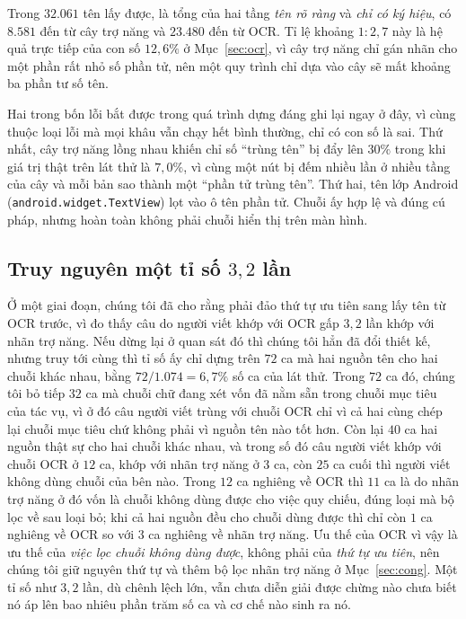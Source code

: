 \documentclass[12pt,a4paper,onecolumn]{article}
\newcommand{\ôvuông}[2]{\tikz[baseline=-0.45ex]{\draw[#1,line width=0.9pt,#2] (0,0) rectangle (0.34,0.18);}}
\newcommand{\code}[1]{{\small\texttt{#1}}}
\begin{document}
Trong $32.061$ tên lấy được, là tổng của hai tầng \emph{tên rõ ràng} và \emph{chỉ có ký
hiệu}, có $8.581$ đến từ cây trợ năng và $23.480$ đến từ OCR. Tỉ lệ khoảng $1{:}2{,}7$ này
là hệ quả trực tiếp của con số $12{,}6\%$ ở Mục~\ref{sec:ocr}, vì cây trợ năng chỉ gán
nhãn cho một phần rất nhỏ số phần tử, nên một quy trình chỉ dựa vào cây sẽ mất khoảng ba
phần tư số tên.

Hai trong bốn lỗi bắt được trong quá trình dựng đáng ghi lại ngay ở đây, vì cùng thuộc loại
lỗi mà mọi khâu vẫn chạy hết bình thường, chỉ có con số là sai. Thứ nhất, cây trợ năng lồng nhau khiến chỉ số ``trùng
tên'' bị đẩy lên $30\%$ trong khi giá trị thật trên lát thử là $7{,}0\%$, vì cùng một nút bị đếm nhiều lần ở nhiều
tầng của cây và mỗi bản sao thành một ``phần tử trùng tên''. Thứ hai, tên lớp Android
(\code{android.widget.TextView}) lọt vào ô tên phần tử. Chuỗi ấy hợp lệ và đúng cú pháp,
nhưng hoàn toàn không phải chuỗi hiển thị trên màn hình.

\subsection{Truy nguyên một tỉ số $3{,}2$ lần}

Ở một giai đoạn, chúng tôi đã cho rằng phải đảo thứ tự ưu tiên sang lấy tên từ OCR trước,
vì đo thấy câu do người viết khớp với OCR gấp $3{,}2$ lần khớp với nhãn trợ năng. Nếu dừng
lại ở quan sát đó thì chúng tôi hẳn đã đổi thiết kế, nhưng truy tới cùng thì tỉ số ấy chỉ
dựng trên $72$ ca mà hai nguồn tên cho hai chuỗi khác nhau, bằng $72/1.074 = 6{,}7\%$ số ca của lát thử. Trong $72$ ca đó, chúng tôi bỏ tiếp $32$
ca mà chuỗi chữ đang xét vốn đã nằm sẵn trong chuỗi mục tiêu của
tác vụ, vì ở đó câu người viết trùng với chuỗi OCR chỉ vì cả
hai cùng chép lại chuỗi mục tiêu chứ không phải vì nguồn tên nào tốt hơn. Còn lại $40$ ca hai nguồn thật sự cho hai chuỗi khác nhau, và trong số đó câu người viết
khớp với chuỗi OCR ở $12$ ca, khớp với nhãn trợ năng ở $3$ ca, còn $25$ ca cuối thì người
viết không dùng chuỗi của bên nào.
Trong $12$ ca nghiêng về OCR thì $11$ ca là do nhãn trợ năng ở đó vốn là chuỗi không dùng được cho việc quy chiếu, đúng loại mà bộ lọc về sau loại bỏ; khi cả hai nguồn đều cho chuỗi dùng được
thì chỉ còn $1$ ca nghiêng về OCR so với $3$ ca nghiêng về nhãn trợ năng. Ưu thế của OCR
vì vậy là ưu thế của \emph{việc lọc chuỗi không dùng được}, không phải của \emph{thứ tự ưu tiên},
nên chúng tôi giữ nguyên thứ tự và thêm bộ lọc nhãn trợ năng ở Mục~\ref{sec:cong}. Một
tỉ số như $3{,}2$ lần, dù chênh lệch lớn, vẫn chưa diễn giải được chừng nào chưa
biết nó áp lên bao nhiêu phần trăm số ca và cơ chế nào sinh ra nó.
\end{document}
